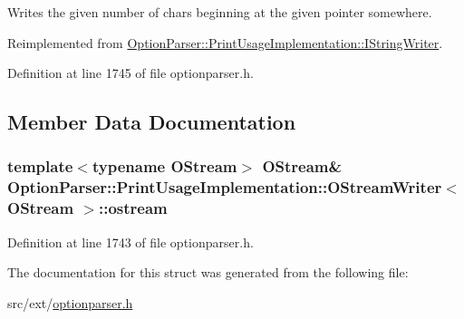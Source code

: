 Writes the given number of chars beginning at the given pointer somewhere. 



Reimplemented from \hyperlink{struct_option_parser_1_1_print_usage_implementation_1_1_i_string_writer_acae5e8911028920188394436f9712251}{Option\-Parser\-::\-Print\-Usage\-Implementation\-::\-I\-String\-Writer}.



Definition at line 1745 of file optionparser.\-h.



\subsection{Member Data Documentation}
\hypertarget{struct_option_parser_1_1_print_usage_implementation_1_1_o_stream_writer_ad8d3bfece068e412d426221939259ace}{
\subsubsection[{ostream}]{\setlength{\rightskip}{0pt plus 5cm}template$<$typename O\-Stream$>$ O\-Stream\& {\bf Option\-Parser\-::\-Print\-Usage\-Implementation\-::\-O\-Stream\-Writer}$<$ O\-Stream $>$\-::ostream}}\label{struct_option_parser_1_1_print_usage_implementation_1_1_o_stream_writer_ad8d3bfece068e412d426221939259ace}


Definition at line 1743 of file optionparser.\-h.



The documentation for this struct was generated from the following file\-:\begin{DoxyCompactItemize}
\item 
src/ext/\hyperlink{optionparser_8h}{optionparser.\-h}\end{DoxyCompactItemize}
